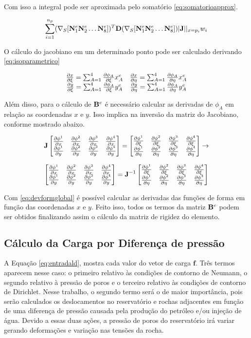 Com isso a integral pode ser aproximada pelo somatório \eqref{eq:somatorioapprox}.

\begin{equation} \label{eq:somatorioapprox}
    \sum^{n_p}_{i=1} (\sopnabla [\basefunctionelem[1] \basefunctionelem[2] \hdots \basefunctionelem[8] ]) ^T \mathbf{D} (\sopnabla [\basefunctionelem[1] \basefunctionelem[2] \hdots \basefunctionelem[8]])|\mathbf{J}||_{x=p_i} w_i
\end{equation}

O cálculo do jacobiano em um determinado ponto pode ser calculado derivando  \eqref{eq:isoparametrico}

\begin{equation}\label{eq:jacobianoderivadas}
\begin{matrix}
\dxi[x] = \sum^4_{A=1} \dxi[\phi_A] x^e_A &  \deta[x] = \sum^4_{A=1} \deta[\phi_A] x^e_A\\
\dxi[y] = \sum^4_{A=1} \dxi[\phi_A] y^e_A &  \deta[y] = \sum^4_{A=1} \deta[\phi_A] y^e_A
\end{matrix}
\end{equation}


Além disso, para o cálculo de $\bee$ é necessário calcular as derivadas de $\phi_A$ em relação as coordenadas $x$ e $y$.  Isso implica na inversão da matriz do Jacobiano, conforme mostrado abaixo.


\begin{equation}
\mathbf{J} \deriv = \der \rightarrow
\end{equation}

\begin{equation} \label{eq:devformglobal}
     \deriv = \mathbf{J} ^{-1}\der
\end{equation}

Com \eqref{eq:devformglobal}  é possível calcular as derivadas das funções de forma em função das coordenadas $x$ e $y$. Feito isso, todos os termos da matriz $\bee$ podem ser obtidos finalizando assim o cálculo da matriz de rigidez do elemento.



\subsection{Cálculo da Carga por Diferença de pressão}

A Equação \eqref{eq:entradald}, mostra cada valor do vetor de carga $\mathbf{f}$. Três termos aparecem nesse caso: o primeiro relativo às condições de contorno de Neumann, o segundo relativo à pressão de poros e o terceiro relativo às condições de contorno de Dirichlet. Nesse trabalho, o segundo termo será o de maior importância, pois serão calculados os deslocamentos no reservatório e rochas adjacentes em função de uma diferença de pressão causada pela produção do petróleo e/ou injeção de água. Devido a essas duas ações, a pressão de poros do reservatório irá variar gerando deformações e variação nas tensões da rocha.


